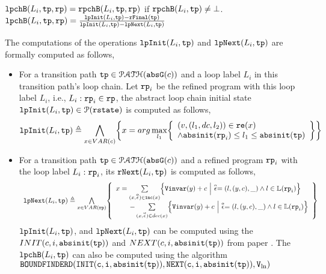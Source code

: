 \begin{enumerate}
\begin{enumerate}
\begin{defn}
\\
$\mathtt{lpchB}(L_i, \mathtt{tp}, \mathtt{rp}) = \mathtt{rpchB}(L_i, \mathtt{tp}, \mathtt{rp})$ if $\mathtt{rpchB}(L_i, \mathtt{tp}) \neq \bot$.
\\
$\mathtt{lpchB}(L_i, \mathtt{tp}, \mathtt{rp}) = 
\frac{\mathtt{lpInit}(L_i, \mathtt{tp}) - \mathtt{rFinal}(\mathtt{tp})}{\mathtt{lpInit}(L_i, \mathtt{tp}) - \mathtt{lpNext}(L_i, \mathtt{tp})}$
\end{defn}
The computations of the operations $\mathtt{lpInit}(L_i, \mathtt{tp})$ and $\mathtt{lpNext}(L_i, \mathtt{tp})$
are formally computed as follows,
\begin{itemize}
\item For a transition path $\mathtt{tp} \in \mathcal{PATH}(\mathtt{abs}{\mathtt{G}}(c))$ and a loop label $L_i$ in this transition path's loop chain.
Let $\mathtt{rp}_i$ be the refined program with this loop label $L_i$, i.e., $L_i: \mathtt{rp}_i \in \mathtt{rp}$, 
the abstract loop chain initial state $\mathtt{lpInit}(L_i, \mathtt{tp}) \in \mathcal{P}(\mathtt{rstate})$ is computed as follows,
\[
  \lpinit(L_i, \tpath) \triangleq 
  \bigwedge_{x \in VAR(c)}
  \left\{ 
  x = arg\max_{l_1}
  \left\{
      \begin{array}{l}
    (v, (l_1, dc, l_2)) \in \reset(x) 
        \\ 
    \land \absinit(\rprog_i) \leq l_1 \leq \absinit(\tpath)
    \end{array}
    \right\}
  \right\}
  \]
\item
For a transition path $\mathtt{tp} \in \mathcal{PATH}(\mathtt{abs}{\mathtt{G}}(c))$ and a refined program $\mathtt{rp}_i$ with the loop label $L_i: \mathtt{rp}_i$, its $\mathtt{rNext}(L_i, \mathtt{tp})$ is computed as follows,
%
\[
  \begin{array}{l}
  \lpnext(L_i, \tpath) \triangleq 
  \bigwedge\limits_{x \in VAR(\rprog)}
  \left\{ 
    \begin{array}{l}
  x =   \sum\limits_{(x, \absevent) \in \inc(x) }\left\{ 
    \varinvar(y) + c ~\middle\vert~ \absevent = (l, (y, c), \_) \land l \in \lvar(\rprog_i)\right\}
    \\ \qquad 
    - \sum\limits_{(x, \absevent) \in dec(x) }\left\{ 
      \varinvar(y) + c ~\middle\vert~ \absevent = (l, (y, c), \_) \land l \in \lvar(\rprog_i) \right\}
    \end{array}
  \right\}
  \end{array}
\]
$\mathtt{lpInit}(L_i, \mathtt{tp})$, and $\mathtt{lpNext}(L_i, \mathtt{tp})$ can be computed using the 
$INIT(c, i, \mathtt{abs}{\mathtt{init}}(\mathtt{tp}))$ and $NEXT(c, i, \mathtt{abs}{\mathtt{init}}(\mathtt{tp}))$ from paper \cite{GulwaniJK09}.
The $\mathtt{lpchB}(L_i, \mathtt{tp})$ can also be computed using the algorithm 
$\mathtt{BOUNDFINDERD(INIT(c, i, \mathtt{abs}{\mathtt{init}}(\mathtt{tp})), NEXT(c, i, \mathtt{abs}{\mathtt{init}}(\mathtt{tp})), V_{\ln})}$

\end{itemize}
\end{enumerate}
\end{enumerate}
